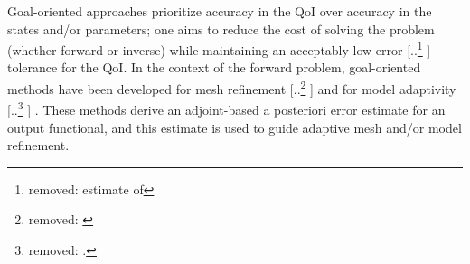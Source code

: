 \documentclass[review]{siamart0516}
\providecommand{\DIFaddtex}[1]{{\protect\color{blue} \sf #1}} %
\providecommand{\DIFdeltex}[1]{{\protect\color{red} [..\footnote{removed: #1} ]}} %
\providecommand{\DIFaddbegin}{} %
\providecommand{\DIFaddend}{} %
\providecommand{\DIFdelbegin}{} %
\providecommand{\DIFdelend}{} %
\providecommand{\DIFadd}[1]{\texorpdfstring{\DIFaddtex{#1}}{#1}} %
\providecommand{\DIFdel}[1]{\texorpdfstring{\DIFdeltex{#1}}{}} %
\newcommand{\DIFscaledelfig}{0.5}
\newlength{\DIFdelgraphicswidth} %
\newlength{\DIFdelgraphicsheight} %
\newcommand{\DIFaddincludegraphics}[2][]{{\color{blue}\fbox{\DIFOincludegraphics[#1]{#2}}}} %
\newcommand{\DIFdelincludegraphics}[2][]{%
\sbox{\DIFdelgraphicsbox}{\DIFOincludegraphics[#1]{#2}}%
\settoboxwidth{\DIFdelgraphicswidth}{\DIFdelgraphicsbox} %
\settoboxtotalheight{\DIFdelgraphicsheight}{\DIFdelgraphicsbox} %
\scalebox{\DIFscaledelfig}{%
\parbox[b]{\DIFdelgraphicswidth}{\usebox{\DIFdelgraphicsbox}\\[-\baselineskip] \rule{\DIFdelgraphicswidth}{0em}}\llap{\resizebox{\DIFdelgraphicswidth}{\DIFdelgraphicsheight}{%
\setlength{\unitlength}{\DIFdelgraphicswidth}%
\begin{picture}(1,1)%
\thicklines\linethickness{2pt} %
{\color[rgb]{1,0,0}\put(0,0){\framebox(1,1){}}}%
{\color[rgb]{1,0,0}\put(0,0){\line( 1,1){1}}}%
{\color[rgb]{1,0,0}\put(0,1){\line(1,-1){1}}}%
\end{picture}%
}\hspace*{3pt}}} %
} %
\DeclareRobustCommand{\DIFaddbegin}{\DIFOaddbegin \let\includegraphics\DIFaddincludegraphics} %
\DeclareRobustCommand{\DIFaddend}{\DIFOaddend \let\includegraphics\DIFOincludegraphics} %
\DeclareRobustCommand{\DIFdelbegin}{\DIFOdelbegin \let\includegraphics\DIFdelincludegraphics} %
\DeclareRobustCommand{\DIFdelend}{\DIFOaddend \let\includegraphics\DIFOincludegraphics} %
\begin{document}
Goal-oriented approaches prioritize accuracy in the QoI over accuracy in the states and/or parameters; one aims to reduce the cost of solving the problem (whether forward or inverse) while maintaining \DIFaddbegin \DIFadd{an }\DIFaddend acceptably low error \DIFdelbegin \DIFdel{estimate of }\DIFdelend \DIFaddbegin \DIFadd{tolerance for }\DIFaddend the QoI. In the context of the forward problem, goal-oriented methods have been developed for mesh refinement \DIFdelbegin \DIFdel{\cite{PrudOden99,VendDarm00,BecRann01,Yano12} }\DIFdelend \DIFaddbegin \DIFadd{\cite{BecRann01,PrudOden99,VendDarm00,Yano12} }\DIFaddend and for model adaptivity~\DIFdelbegin \DIFdel{\cite{OdenPrudetal06,BraackErn03}. %
}\DIFdelend \DIFaddbegin \DIFadd{\cite{BraackErn03,OdenPrudetal06}. }\DIFaddend These methods derive an adjoint-based a posteriori error estimate for an output functional, and this estimate is used to guide adaptive mesh and/or model refinement.
\end{document}
